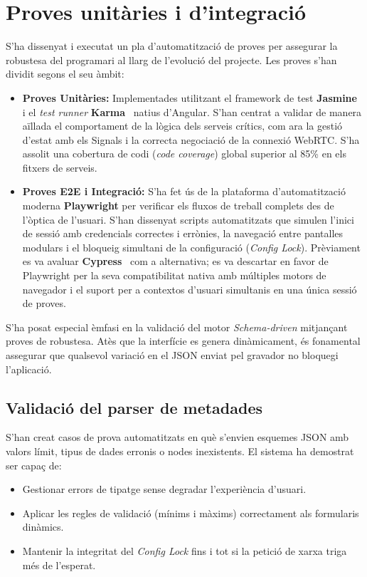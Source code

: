 \section{Proves unitàries i d'integració}
S'ha dissenyat i executat un pla d'automatització de proves per assegurar la robustesa del programari al llarg de l'evolució del projecte. Les proves s'han dividit segons el seu àmbit:
\begin{itemize}
    \item {\sloppy\textbf{Proves Unitàries:} Implementades utilitzant el framework de test \textbf{Jasmine}~\cite{jasmine_testing} i el \textit{test runner} \textbf{Karma}~\cite{karma_runner} natius d'Angular. S'han centrat a validar de manera aïllada el comportament de la lògica dels serveis crítics, com ara la gestió d'estat amb els Signals i la correcta negociació de la connexió WebRTC. S'ha assolit una cobertura de codi (\textit{code coverage}) global superior al 85\% en els fitxers de serveis.\par}
    \item \textbf{Proves E2E i Integració:} S'ha fet ús de la plataforma d'automatització moderna \textbf{Playwright} \cite{playwright_testing} per verificar els fluxos de treball complets des de l'òptica de l'usuari. S'han dissenyat scripts automatitzats que simulen l'inici de sessió amb credencials correctes i errònies, la navegació entre pantalles modulars i el bloqueig simultani de la configuració (\textit{Config Lock}). Prèviament es va avaluar \textbf{Cypress}~\cite{cypress_testing} com a alternativa; es va descartar en favor de Playwright per la seva compatibilitat nativa amb múltiples motors de navegador i el suport per a contextos d'usuari simultanis en una única sessió de proves.
\end{itemize}

S'ha posat especial èmfasi en la validació del motor \textit{Schema-driven} mitjançant proves de robustesa. Atès que la interfície es genera dinàmicament, és fonamental assegurar que qualsevol variació en el JSON enviat pel gravador no bloquegi l'aplicació.

\subsection{Validació del parser de metadades}
S'han creat casos de prova automatitzats en què s'envien esquemes JSON amb valors límit, tipus de dades erronis o nodes inexistents. El sistema ha demostrat ser capaç de:
\begin{itemize}
    \item Gestionar errors de tipatge sense degradar l'experiència d'usuari.
    \item Aplicar les regles de validació (mínims i màxims) correctament als formularis dinàmics.
    \item Mantenir la integritat del \textit{Config Lock} fins i tot si la petició de xarxa triga més de l'esperat.
\end{itemize}

